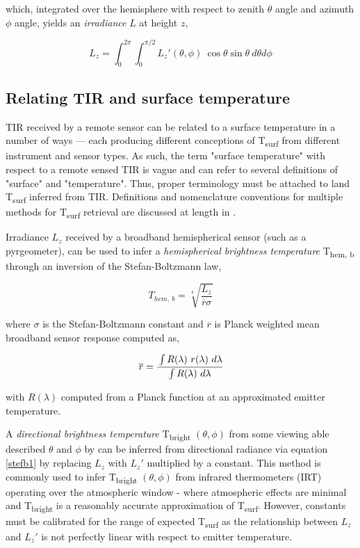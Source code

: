 \begin{bibunit}
\noindent which, integrated over the hemisphere with respect to zenith \(\theta\) angle and azimuth \(\phi\) angle, yields an \textit{irradiance} $ L $ at height $ z $,

\begin{equation}
L_z = \int_{0}^{2\pi} \int_{0}^{\pi/2} L_z'(\theta, \phi) ~ \cos\theta \sin\theta ~ d\theta d\phi
\end{equation}

\subsection{Relating TIR and surface temperature}

TIR received by a remote sensor can be related to a surface temperature in a number of ways --- each producing different conceptions of T\textsubscript{surf} from different instrument and sensor types. As such, the term "surface temperature" with respect to a remote sensed TIR is vague and can refer to several definitions of "surface" and "temperature". Thus, proper terminology must be attached to land T\textsubscript{surf} inferred from TIR. Definitions and nomenclature conventions for multiple methods for T\textsubscript{surf} retrieval are discussed at length in \citet{Norman1995}.

 Irradiance $L_z$ received by a broadband hemispherical sensor (such as a pyrgeometer), can be used to infer a \textit{hemispherical brightness temperature} T\textsubscript{hem, b} through an inversion of the Stefan-Boltzmann law,

\begin{equation}
\label{stefb1}
T_{hem,~ b} = \sqrt[4]{\frac{L_z}{\overline{r}\sigma}}
\end{equation}

\noindent where $ \sigma $ is the Stefan-Boltzmann constant and $ \overline{r} $ is Planck weighted mean broadband sensor response computed as,

\begin{equation}
\label{meansens}
\overline{r} = \cfrac{\int R(\lambda) ~ r(\lambda)~d\lambda}{\int R(\lambda) ~ d\lambda}
\end{equation}

\noindent with $ R(\lambda) $ computed from a Planck function at an approximated emitter temperature. 

A \textit{directional brightness temperature} T\textsubscript{bright} $(\theta, \phi)$ from some viewing able described $\theta$ and $\phi$ by can be inferred from directional radiance via equation \ref{stefb1} by replacing $ L_z $ with $L_z'$ multiplied by a constant. This method is commonly used to infer T\textsubscript{bright} $(\theta, \phi)$ from infrared thermometers (IRT) operating over the atmospheric window - where atmospheric effects are minimal and T\textsubscript{bright} is a reasonably accurate approximation of T\textsubscript{surf}. However, constants must be calibrated for the range of expected T\textsubscript{surf} as the relationship between $ L_z $ and $L_z'$  is not perfectly linear with respect to emitter temperature.


\end{bibunit}
